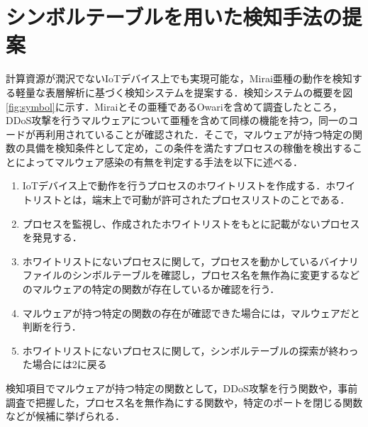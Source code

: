 \section{シンボルテーブルを用いた検知手法の提案}
計算資源が潤沢でないIoTデバイス上でも実現可能な，Mirai亜種の動作を検知する軽量な表層解析に基づく検知システムを提案する．検知システムの概要を図\ref{fig:symbol}に示す．Miraiとその亜種であるOwariを含めて調査したところ，DDoS攻撃を行うマルウェアについて亜種を含めて同様の機能を持つ，同一のコードが再利用されていることが確認された．そこで，マルウェアが持つ特定の関数の具備を検知条件として定め，この条件を満たすプロセスの稼働を検出することによってマルウェア感染の有無を判定する手法を以下に述べる．\\

\begin{enumerate}
 \item IoTデバイス上で動作を行うプロセスのホワイトリストを作成する．ホワイトリストとは，端末上で可動が許可されたプロセスリストのことである．
 \item プロセスを監視し、作成されたホワイトリストをもとに記載がないプロセスを発見する．
 \item ホワイトリストにないプロセスに関して，プロセスを動かしているバイナリファイルのシンボルテーブルを確認し，プロセス名を無作為に変更するなどのマルウェアの特定の関数が存在しているか確認を行う．
\item マルウェアが持つ特定の関数の存在が確認できた場合には，マルウェアだと判断を行う．
 \item ホワイトリストにないプロセスに関して，シンボルテーブルの探索が終わった場合には2に戻る
\end{enumerate}

 検知項目でマルウェアが持つ特定の関数として，DDoS攻撃を行う関数や，事前調査で把握した，プロセス名を無作為にする関数や，特定のポートを閉じる関数などが候補に挙げられる．
 
